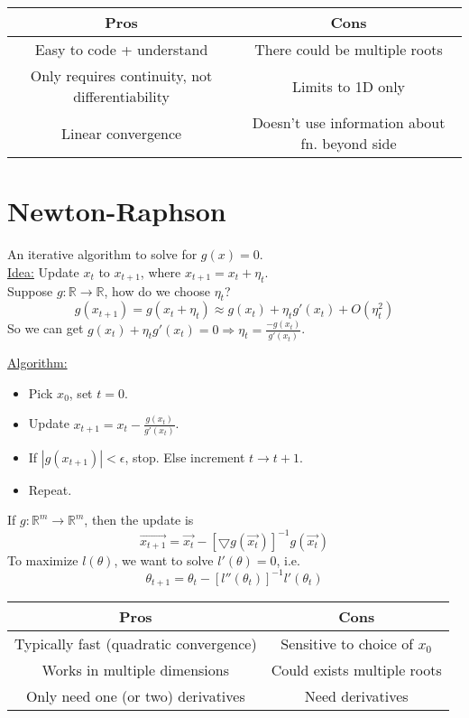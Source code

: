\documentclass[12pt,a4paper]{article}
\begin{document}
\begin{center}
\begin{tabular}{|c|c|}
\hline
Pros & Cons \\
\hline
Easy to code + understand & There could be multiple roots\\
Only requires continuity, not differentiability & Limits to 1D only\\
Linear convergence & Doesn't use information about fn. beyond side\\
\hline
\end{tabular}
\end{center}

\section{Newton-Raphson}
An iterative algorithm to solve for $g(x) = 0$.\\
\underline{Idea:} Update $x_t$ to $x_{t+1}$, where $x_{t+1} = x_t + \eta_t$.\\
Suppose $g:\mathbb{R} \rightarrow \mathbb{R}$, how do we choose $\eta_t$?
\[
g(x_{t+1}) = g(x_t + \eta_t) \approx g(x_t) + \eta_tg'(x_t) + O(\eta_t^2)
\]
So we can get $g(x_t) + \eta_tg'(x_t) = 0 \Rightarrow \eta_t = \frac{-g(x_t)}{g'(x_t)}$.

\noindent \underline{Algorithm:}
\begin{itemize}
\item Pick $x_0$, set $t = 0$.
\item Update $x_{t+1} = x_t - \frac{g(x_t)}{g'(x_t)}$.
\item If $|g(x_{t+1})| < \epsilon$, stop. Else increment $t\rightarrow t+1$.
\item Repeat.
\end{itemize}

\noindent If $g:\mathbb{R}^m \rightarrow \mathbb{R}^m$, then the update is 
\[
\overrightarrow{x_{t+1}} = \overrightarrow{x_t} - [\bigtriangledown g(\overrightarrow{x_t})]^{-1}g(\overrightarrow{x_t})
\]
To maximize $l(\theta)$, we want to solve $l'(\theta) = 0$, i.e. 
\[
\theta_{t+1} = \theta_t - [l''(\theta_t)]^{-1}l'(\theta_t)
\]

\begin{center}
\begin{tabular}{|c|c|}
\hline
Pros & Cons \\
\hline
Typically fast (quadratic convergence) & Sensitive to choice of $x_0$\\
Works in multiple dimensions & Could exists multiple roots\\
Only need one (or two) derivatives & Need derivatives\\
\hline
\end{tabular}
\end{center}
\end{document}
